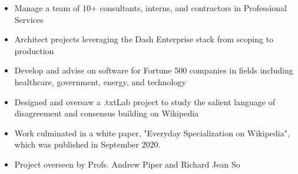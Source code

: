 \documentclass[10pt,ragged2e]{altacv}
\begin{document}
\tagline{}

\begin{fullwidth}
\makecvheader
\end{fullwidth}



\begin{itemize}
\item Manage a team of 10+ consultants, interns, and contractors in Professional Services
\item Architect projects leveraging the Dash Enterprise stack from scoping to production
\item Develop and advise on software for Fortune 500 companies in fields including healthcare, government, energy, and technology

\end{itemize}

\divider

\begin{itemize}
\item Designed and oversaw a .txtLab project to study the salient language of disagreement and consensus building on Wikipedia
\item Work culminated in a white paper, "Everyday Specialization on Wikipedia", which was published in September 2020.
\item Project overseen by Profs. Andrew Piper and Richard Jean So
\end{itemize}
\end{document}
